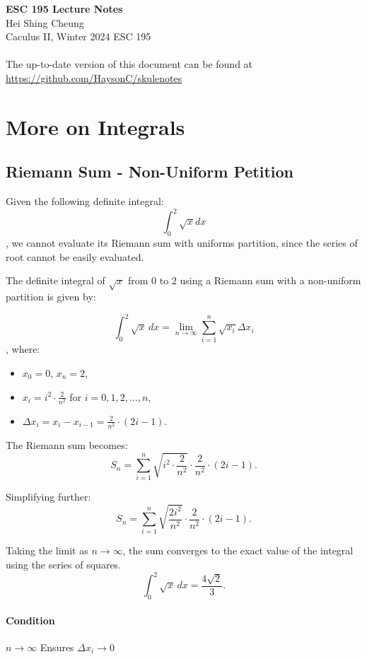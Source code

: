 \documentclass[11pt]{article}
\begin{document}
\thispagestyle{empty}
{\LARGE \bf ESC 195 Lecture Notes}\\
{\large Hei Shing Cheung}\\
Caculus II, Winter 2024 \hfill ESC 195\\
\\
The up-to-date version of this document can be found at \url{https://github.com/HaysonC/skulenotes}\\

\section{More on Integrals}
\subsection{Riemann Sum - Non-Uniform Petition}
\begin{example}
    Given the following definite integral:
    $$\int^2_0 \sqrt{x} dx$$, we cannot evaluate its Riemann sum with uniforms partition, since the series of root cannot be easily evaluated. 
\end{example}

The definite integral of $\sqrt{x}$ from $0$ to $2$ using a Riemann sum with a non-uniform partition is given by:

$$\int_{0}^{2} \sqrt{x} \, dx = \lim_{n \to \infty} \sum_{i=1}^n \sqrt{x_i} \Delta x_i$$
, where:
\begin{itemize}
    \item $x_0 = 0, \, x_n = 2$,
    \item $x_i = i^2 \cdot \frac{2}{n^2}$ for $i = 0, 1, 2, \dots, n$,
    \item $\Delta x_i = x_i - x_{i-1} = \frac{2}{n^2} \cdot (2i - 1)$.
\end{itemize}

The Riemann sum becomes:
$$
S_n = \sum_{i=1}^n \sqrt{i^2 \cdot \frac{2}{n^2}} \cdot \frac{2}{n^2} \cdot (2i - 1).
$$

Simplifying further:
$$
S_n = \sum_{i=1}^n \sqrt{\frac{2i^2}{n^2}} \cdot \frac{2}{n^2} \cdot (2i - 1).
$$

Taking the limit as $n \to \infty$, the sum converges to the exact value of the integral using the series of squares. 
$$
\int_{0}^{2} \sqrt{x} \, dx = \frac{4\sqrt{2}}{3}.
$$
\paragraph{Condition} $n \to \infty$ Ensures $\Delta x_i \to 0$
\end{document}
